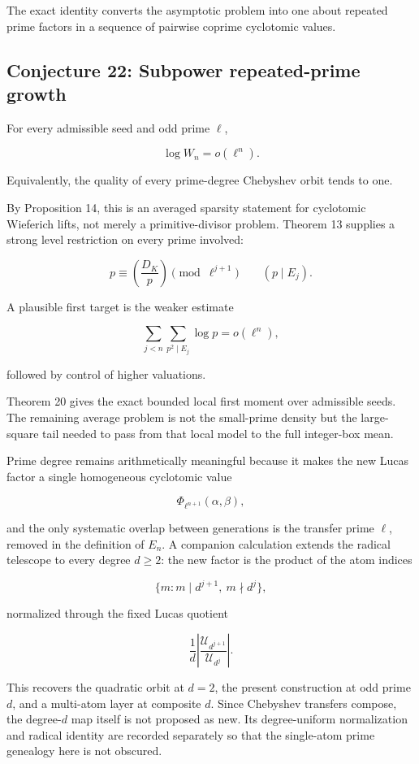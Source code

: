 \documentclass[11pt]{article}
\begin{document}
The exact identity converts the asymptotic problem into one about repeated
prime factors in a sequence of pairwise coprime cyclotomic values.

\subsection{Conjecture 22: Subpower repeated-prime growth}

For every admissible seed and odd prime \(\ell\),

\[
\log W_n=o(\ell^n).
\]

Equivalently, the quality of every prime-degree Chebyshev orbit tends to
one.

By Proposition 14, this is an averaged sparsity statement for cyclotomic
Wieferich lifts, not merely a primitive-divisor problem. Theorem 13
supplies a strong level restriction on every prime involved:

\[
p
\equiv
\left(\frac{D_K}{p}\right)
\pmod{\ell^{j+1}}
\qquad
(p\mid E_j).
\]

A plausible first target is the weaker estimate

\[
\sum_{j<n}
\sum_{p^2\mid E_j}
\log p
=
o(\ell^n),
\]

followed by control of higher valuations.

Theorem 20 gives the exact bounded local first moment over admissible
seeds. The remaining average problem is not the small-prime density but
the large-square tail needed to pass from that local model to the full
integer-box mean.

Prime degree remains arithmetically meaningful because it makes the new
Lucas factor a single homogeneous cyclotomic value

\[
\Phi_{\ell^{n+1}}(\alpha,\beta),
\]

and the only systematic overlap between generations is the transfer prime
\(\ell\), removed in the definition of \(E_n\). A companion calculation
extends the radical telescope to every degree \(d\geq2\): the new factor
is the product of the atom indices

\[
\{m:m\mid d^{j+1},\ m\nmid d^j\},
\]

normalized through the fixed Lucas quotient

\[
\frac1d
\left|
\frac{\mathcal U_{d^{j+1}}}{\mathcal U_{d^j}}
\right|.
\]

This recovers the quadratic orbit at \(d=2\), the present construction at
odd prime \(d\), and a multi-atom layer at composite \(d\). Since
Chebyshev transfers compose, the degree-\(d\) map itself is not proposed
as new. Its degree-uniform normalization and radical identity are recorded
separately so that the single-atom prime genealogy here is not obscured.
\end{document}
